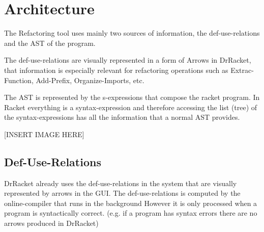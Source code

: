
\section{Architecture}
The Refactoring tool uses mainly two sources of information, the def-use-relations and
the AST of the program.

The def-use-relations are visually represented in a form of Arrows in DrRacket,
that information is especially relevant for refactoring operations such as Extrac-Function,
Add-Prefix, Organize-Imports, etc.

The AST is represented by the s-expressions that compose the racket program. In
Racket everything is a syntax-expression and therefore accessing the list (tree)
of the syntax-expressions has all the information that a normal AST provides.


[INSERT IMAGE HERE]


\subsection{Def-Use-Relations}

DrRacket already uses the def-use-relations in the system that are visually
represented by arrows in the GUI.
The def-use-relations is computed by the online-compiler that runs in the background
However it is only processed when a program is syntactically correct. (e.g. if
a program has syntax errors there are no arrows produced in DrRacket)


